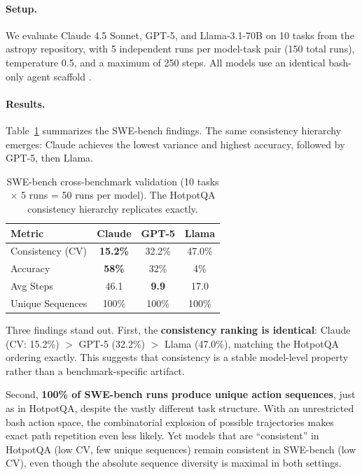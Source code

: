 \documentclass{article}
\begin{document}
\paragraph{Setup.} We evaluate Claude 4.5 Sonnet, GPT-5, and Llama-3.1-70B on 10 tasks from the astropy repository, with 5 independent runs per model-task pair (150 total runs), temperature 0.5, and a maximum of 250 steps. All models use an identical bash-only agent scaffold \citep{mehta2026swebench}.

\paragraph{Results.} Table~\ref{tab:swebench} summarizes the SWE-bench findings. The same consistency hierarchy emerges: Claude achieves the lowest variance and highest accuracy, followed by GPT-5, then Llama.

\begin{table}[h]
\centering
\small
\caption{SWE-bench cross-benchmark validation (10 tasks $\times$ 5 runs = 50 runs per model). The HotpotQA consistency hierarchy replicates exactly.}
\label{tab:swebench}
\begin{tabular}{lccc}
\toprule
\textbf{Metric} & \textbf{Claude} & \textbf{GPT-5} & \textbf{Llama} \\
\midrule
Consistency (CV) & \textbf{15.2\%} & 32.2\% & 47.0\% \\
Accuracy & \textbf{58\%} & 32\% & 4\% \\
Avg Steps & 46.1 & \textbf{9.9} & 17.0 \\
Unique Sequences & 100\% & 100\% & 100\% \\
\bottomrule
\end{tabular}
\end{table}

Three findings stand out. First, the \textbf{consistency ranking is identical}: Claude (CV: 15.2\%) $>$ GPT-5 (32.2\%) $>$ Llama (47.0\%), matching the HotpotQA ordering exactly. This suggests that consistency is a stable model-level property rather than a benchmark-specific artifact.

Second, \textbf{100\% of SWE-bench runs produce unique action sequences}, just as in HotpotQA, despite the vastly different task structure. With an unrestricted bash action space, the combinatorial explosion of possible trajectories makes exact path repetition even less likely. Yet models that are ``consistent'' in HotpotQA (low CV, few unique sequences) remain consistent in SWE-bench (low CV), even though the absolute sequence diversity is maximal in both settings.
\end{document}
